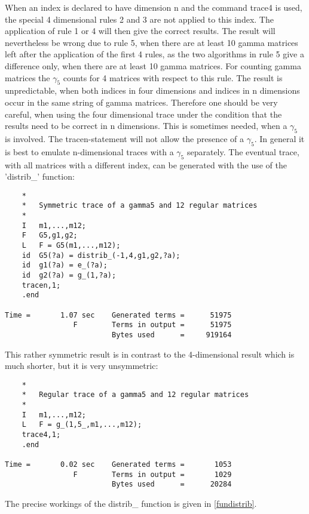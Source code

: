 When an index is declared to have dimension n and the command trace4 is 
used, the special 4 dimensional rules 2 and 3 are not applied to this 
index. The application of rule 1 or 4 will then give the correct 
results. The result will nevertheless be wrong due to rule 5, when there 
are at least 10 gamma matrices left after the application of the first 4 
rules, as the two algorithms in rule 5 give a difference only, when 
there are at least 10 gamma matrices. For counting gamma matrices the 
$\gamma_5$ counts for 4 matrices with respect to this rule. The result 
is unpredictable, when both indices in four dimensions and indices in n 
dimensions occur in the same string of gamma matrices. Therefore one 
should be very careful, when using the four dimensional trace under the 
condition that the results need to be correct in n dimensions. This is 
sometimes needed, when a $\gamma_5$ is involved. The tracen-statement 
will not allow the presence of a $\gamma_5$. In general it is best to 
emulate n-dimensional traces with a $\gamma_5$ separately. The eventual 
trace, with all matrices with a different index, can be generated with 
the use of the 'distrib\_' function:
\begin{verbatim}
    *
    *   Symmetric trace of a gamma5 and 12 regular matrices
    *
    I   m1,...,m12;
    F   G5,g1,g2;
    L   F = G5(m1,...,m12);
    id  G5(?a) = distrib_(-1,4,g1,g2,?a);
    id  g1(?a) = e_(?a);
    id  g2(?a) = g_(1,?a);
    tracen,1;
    .end

Time =       1.07 sec    Generated terms =      51975
                F        Terms in output =      51975
                         Bytes used      =     919164
\end{verbatim}
This rather symmetric result is in contrast to the 4-dimensional result 
which is much shorter, but it is very unsymmetric:
\begin{verbatim}
    *
    *   Regular trace of a gamma5 and 12 regular matrices
    *
    I   m1,...,m12;
    L   F = g_(1,5_,m1,...,m12);
    trace4,1;
    .end

Time =       0.02 sec    Generated terms =       1053
                F        Terms in output =       1029
                         Bytes used      =      20284
\end{verbatim}
The precise workings of the distrib\_ function is given in 
\ref{fundistrib}.


